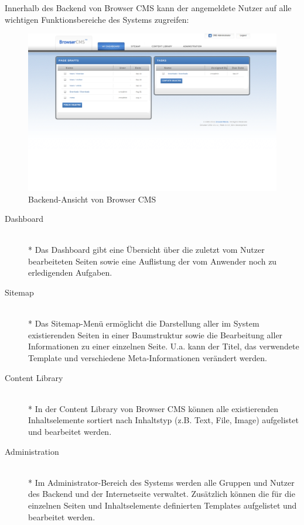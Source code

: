 Innerhalb des Backend von Browser CMS kann der angemeldete Nutzer auf alle wichtigen Funktionsbereiche des Systems zugreifen:


\begin{figure}[!h]
\begin{center}
\includegraphics[scale=0.3]{images/analyse/browser/backend.png}
\caption{Backend-Ansicht von Browser CMS}
\label{browserbackend}
\end{center}
\end{figure}


\begin{description}
\item[Dashboard]\mbox{~}\\*
Das Dashboard gibt eine Übersicht über die zuletzt vom Nutzer bearbeiteten Seiten sowie eine Auflistung der vom Anwender noch zu erledigenden Aufgaben.
\item[Sitemap]\mbox{~}\\*
Das Sitemap-Menü ermöglicht die Darstellung aller im System existierenden Seiten in einer Baumstruktur sowie die Bearbeitung aller Informationen zu einer einzelnen Seite. U.a. kann der Titel, das verwendete Template und verschiedene Meta-Informationen verändert werden.
\item[Content Library]\mbox{~}\\*
In der Content Library von Browser CMS können alle existierenden Inhaltselemente sortiert nach Inhaltstyp (z.B. Text, File, Image) aufgelistet und bearbeitet werden.
\item[Administration]\mbox{~}\\*
Im Administrator-Bereich des Systems werden alle Gruppen und Nutzer des Backend und der Internetseite verwaltet. Zusätzlich können die für die einzelnen Seiten und Inhaltselemente definierten Templates aufgelistet und bearbeitet werden.
\end{description}

